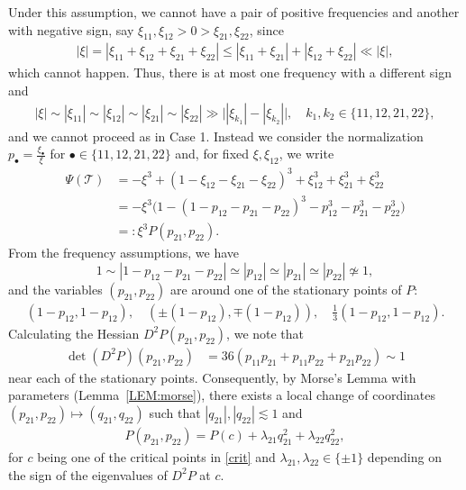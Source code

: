 \documentclass[a4paper,
11pt,  reqno]{amsart}
\newcommand{\5}{\textup{V}}
\newcommand{\les}{\lesssim}
\theoremstyle{remark}
\newcommand{\bul}{\bullet}
\newcommand{\TT}{\mathcal{T}}
\newcommand{\ld}{\lambda}
\numberwithin{equation}{section}
\numberwithin{theorem}{section}
\begin{document}
Under this assumption, we cannot have a pair of positive frequencies and another with negative sign, say $\xi_{11},\xi_{12}>0>\xi_{21}, \xi_{22}$, since
\begin{align}
    |\xi| = |\xi_{11} + \xi_{12} + \xi_{21} + \xi_{22} |
    \le |\xi_{11} + \xi_{21}| + |\xi_{12} + \xi_{22}| \ll |\xi|,
\end{align}
which cannot happen. Thus, there is at most one frequency with a different sign and
\begin{align}
   |\xi|\sim |\xi_{11}| \sim |\xi_{12}| \sim |\xi_{21}| \sim |\xi_{22}| \gg
    \big| |\xi_{k_1}| - |\xi_{k_2}| \big|, \quad k_1,k_2 \in \{11,12,21,22\},
\end{align}
and we cannot proceed as in Case 1. Instead we consider the normalization $p_\bul = \frac{\xi_\bul}{\xi}$ for $\bul\in\{11, 12, 21, 22\}$ and, for fixed $\xi, \xi_{12}$, we write
\begin{align}
    \Psi(\TT)
    &
    =  - \xi^3 + (1-\xi_{12} - \xi_{21} - \xi_{22})^3 + \xi_{12}^3 +  \xi_{21}^3 +  \xi_{22}^3
    \\
    &
    =
     - \xi^3 \big( 1 - (1-p_{12} - p_{21}-p_{22})^3 - p_{12}^3 - p_{21}^3 - p_{22}^3 \big)
    \\
    & = : \xi^3 P(p_{21}, p_{22} ).
\end{align}
From the frequency assumptions, we have
$$1\sim |1 - p_{12}-p_{21} - p_{22}| \simeq |p_{12}| \simeq |p_{21} |\simeq |p_{22}|\not\simeq 1,$$
and the variables $(p_{21}, p_{22})$ are around one of the stationary points of $P$:
\begin{align}\label{crit}
    (1-p_{12}, 1-p_{12}), \quad (\pm(1-p_{12}), \mp(1-p_{12})), \quad \tfrac13(1-p_{12}, 1-p_{12}).
\end{align}
Calculating the Hessian $D^2 P(p_{21}, p_{22})$, we note that
\begin{align}
 \det(D^2 P)(p_{21}, p_{22})
 &
 = 36 (p_{11} p_{21} + p_{11} p_{22} + p_{21} p_{22} ) \sim 1
\end{align}
near each of the stationary points.
Consequently, by Morse's Lemma with parameters (Lemma~\ref{LEM:morse}), there exists a local change of coordinates $( p_{21}, p_{22}) \mapsto (q_{21}, q_{22})$ such that $|q_{21}|, |q_{22}| \les 1 $ and
\begin{align}
P(p_{21}, p_{22})
 = P(c) + \ld_{21} q_{21}^2 + \ld_{22} q_{22}^2,
\end{align}
for $c$ being one of the critical points in \eqref{crit} and $\ld_{21}, \ld_{22} \in \{\pm1\}$ depending on the sign of the eigenvalues of $D^2P$ at $c$.
\end{document}

